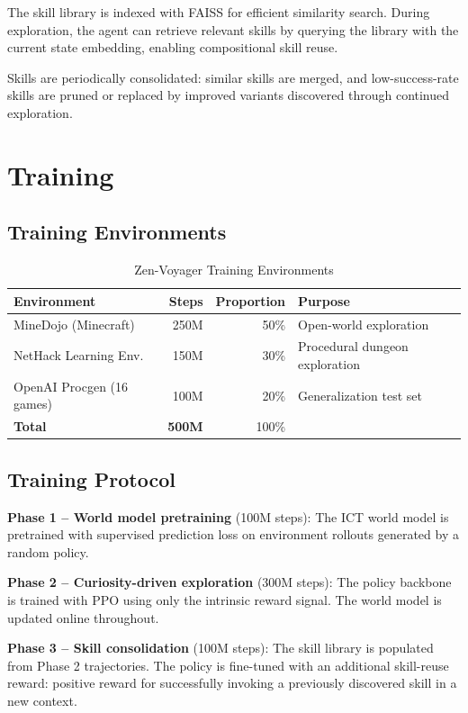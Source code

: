 \documentclass[11pt,a4paper]{article}
\begin{document}
The skill library is indexed with FAISS for efficient similarity search. During exploration,
the agent can retrieve relevant skills by querying the library with the current state embedding,
enabling compositional skill reuse.

Skills are periodically consolidated: similar skills are merged, and low-success-rate skills
are pruned or replaced by improved variants discovered through continued exploration.

\section{Training}

\subsection{Training Environments}

\begin{table}[H]
\centering
\begin{tabular}{lrrl}
\toprule
\textbf{Environment} & \textbf{Steps} & \textbf{Proportion} & \textbf{Purpose} \\
\midrule
MineDojo (Minecraft) & 250M & 50\% & Open-world exploration \\
NetHack Learning Env. & 150M & 30\% & Procedural dungeon exploration \\
OpenAI Procgen (16 games) & 100M & 20\% & Generalization test set \\
\midrule
\textbf{Total} & \textbf{500M} & 100\% & \\
\bottomrule
\end{tabular}
\caption{Zen-Voyager Training Environments}
\end{table}

\subsection{Training Protocol}

\textbf{Phase 1 -- World model pretraining} (100M steps): The ICT world model is pretrained
with supervised prediction loss on environment rollouts generated by a random policy.

\textbf{Phase 2 -- Curiosity-driven exploration} (300M steps): The policy backbone is trained
with PPO using only the intrinsic reward signal. The world model is updated online throughout.

\textbf{Phase 3 -- Skill consolidation} (100M steps): The skill library is populated from
Phase 2 trajectories. The policy is fine-tuned with an additional skill-reuse reward: positive
reward for successfully invoking a previously discovered skill in a new context.
\end{document}
